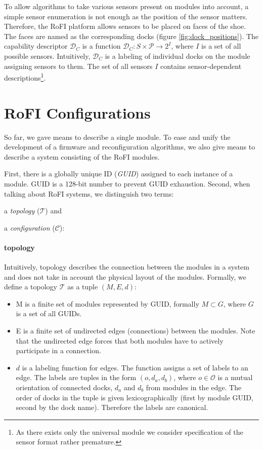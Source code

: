 To allow algorithms to take various sensors present on modules into account, a
simple sensor enumeration is not enough as the position of the sensor matters.
Therefore, the RoFI platform allows sensors to be placed on faces of the shoe.
The faces are named as the corresponding docks (figure
\ref{fig:dock_positions}). The capability descriptor $\mathcal{D}_C$ is a
function $\mathcal{D}_C: S\times\mathcal{P} \rightarrow 2^{I}$, where $I$ is a
set of all possible sensors. Intuitively, $\mathcal{D}_C$ is a labeling of
individual docks on the module assigning sensors to them. The set of all sensors
$I$ contains sensor-dependent descriptions\footnote{As there exists only the
universal module we consider specification of the sensor format rather
premature.}.

\section{RoFI Configurations} \label{sec:configuration}

So far, we gave means to describe a single module. To ease and unify the
development of a firmware and reconfiguration algorithms, we also give means to
describe a system consisting of the RoFI modules.

First, there is a globally unique ID (\emph{GUID}) assigned to each instance of
a module. GUID is a 128-bit number to prevent GUID exhaustion. Second, when
talking about RoFI systems, we distinguish two terms:
\begin{enumerate*}
    \item a \emph{topology} ($\mathcal{T}$) and
    \item a \emph{configuration} ($\mathcal{C}$):
\end{enumerate*}

\paragraph{topology} Intuitively, topology describes the connection between the
modules in a system and does not take in account the physical layout of the
modules. Formally, we define a topology $\mathcal{T}$ as a tuple $(M, E, d)$:
\begin{itemize}
    \item M is a finite set of modules represented by GUID, formally $M\subset
    G$, where $G$ is a set of all GUIDs.
    \item E is a finite set of undirected edges (connections) between the
    modules. Note that the undirected edge forces that both modules have to
    actively participate in a connection.
    \item $d$ is a labeling function for edges. The function assigns a set of
    labels to an edge. The labels are tuples in the form $(o, d_a, d_b)$, where
    $o\in\mathcal{O}$ is a mutual orientation of connected docks, $d_a$ and
    $d_b$ from modules in the edge. The order of docks in the tuple is given
    lexicographically (first by module GUID, second by the dock name). Therefore
    the labels are canonical.
\end{itemize}

